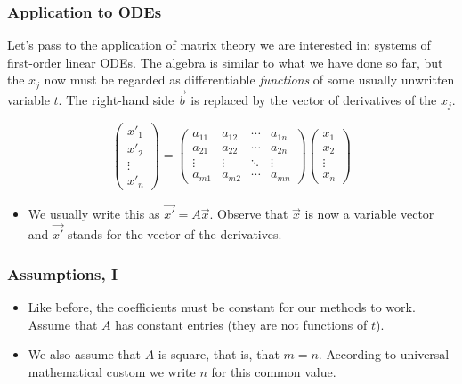 \begin{frame}

\frametitle{Application to ODEs}
\label{applicationtoodes}

Let's pass to the application of matrix theory we are interested in: systems of first-order linear ODEs. The algebra is similar to what we have done so far, but the $ x_j $ now must be regarded as differentiable \emph{functions} of some usually unwritten variable $ t $. The right-hand side $ \vec{b} $ is replaced by the vector of derivatives of the $ x_j $.

\[
    \begin{pmatrix}
        x'_1 \\ x'_2 \\ \vdots \\ x'_n
    \end{pmatrix} = \begin{pmatrix}
        a_{11} & a_{12} & \cdots & a_{1n} \\
        a_{21} & a_{22} & \cdots & a_{2n} \\
        \vdots & \vdots & \ddots & \vdots \\
        a_{m1} & a_{m2} & \cdots & a_{mn} 
    \end{pmatrix}
    \begin{pmatrix}
        x_1 \\ x_2 \\ \vdots \\ x_n
    \end{pmatrix}
\]

\begin{itemize}
\item We usually write this as $ \vec{x'} = A \vec{x} $. Observe that $ \vec{x} $ is now a variable vector and $ \vec{x'} $ stands for the vector of the derivatives.

\end{itemize}

\end{frame}

\begin{frame}

\frametitle{Assumptions, I}
\label{assumptionsi}

\begin{itemize}
\item Like before, the coefficients must be constant for our methods to work. Assume that $ A $ has constant entries (they are not functions of $ t $).

\item We also assume that $ A $ is square, that is, that $ m = n $. According to universal mathematical custom we write $ n $ for this common value.

\end{itemize}

\end{frame}

